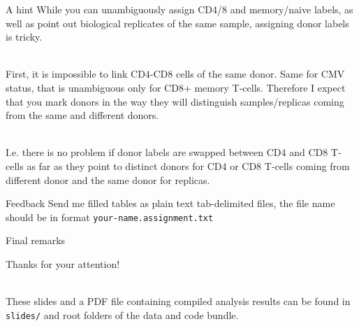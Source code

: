 \documentclass[12pt]{beamer}
\begin{document}
\begin{frame}{A hint}
While you can unambiguously assign CD4/8 and memory/naive labels, as well as point out biological replicates of the same sample, assigning donor labels is tricky.\\~\

First, it is impossible to link CD4-CD8 cells of the same donor. Same for CMV status, that is unambiguous only for CD8+ memory T-cells. Therefore I expect that you mark donors in the way they will distinguish samples/replicas coming from the same and different donors.\\~\

I.e. there is no problem if donor labels are swapped between CD4 and CD8 T-cells as far as they point to distinct donors for CD4 or CD8 T-cells coming from different donor and the same donor for replicas.
\end{frame}

\begin{frame}{Feedback}
Send me filled tables as plain text tab-delimited files, the file name should be in format \texttt{your-name.assignment.txt}
\end{frame}

\begin{frame}{Final remarks}
\begin{LARGE}
\begin{center}
Thanks for your attention!\\~\
\end{center}
\end{LARGE}


These slides and a PDF file containing compiled analysis results can be found in \texttt{slides/} and root folders of the data and code bundle.
\end{frame}
\end{document}
